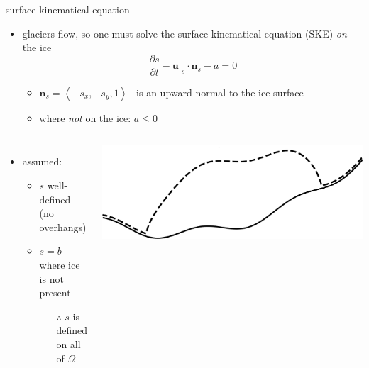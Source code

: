\documentclass[usepdftitle=false,usenames,dvipsnames]{beamer}
\newcommand{\bn}{\mathbf{n}}
\newcommand{\bu}{\mathbf{u}}
\begin{document}
\begin{frame}{surface kinematical equation}

\begin{itemize}
\item glaciers flow, so one must solve the surface kinematical equation (SKE) \emph{on} the ice
    $$\frac{\partial s}{\partial t} - \bu|_s \cdot \bn_s - a = 0$$

    \begin{itemize}
    \item $\bn_s = \left<-s_x,-s_y,1\right>$  \, is an upward normal to the ice surface

\vspace{4mm}
    \item where \emph{not} on the ice: $a\le 0$
    \end{itemize}
\end{itemize}

\bigskip
\begin{columns}
        \begin{itemize}
        \item assumed:
            \begin{itemize}
            \item $s$ well-defined (no overhangs)
            \item $s=b$ where ice is not present

                \begin{itemize}
                \item[{\color{black} $\therefore$}] $s$ is defined on all of $\Omega$
                \end{itemize}
            \end{itemize}
        \end{itemize}
        \includegraphics[width=1.0\textwidth]{figs/simpledomain.png}
\end{columns}
\end{frame}
\end{document}
